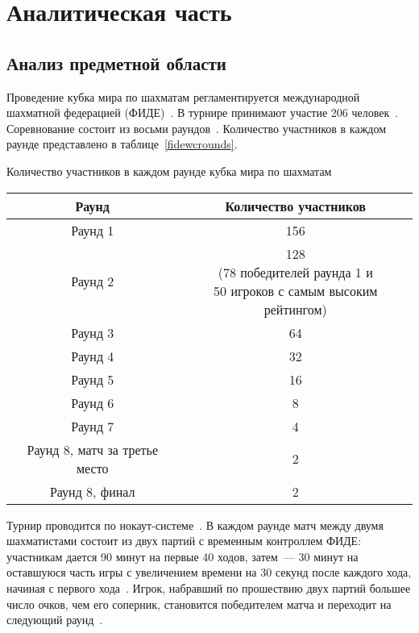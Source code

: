 \chapter{Аналитическая часть}

\section{Анализ предметной области}

Проведение кубка мира по шахматам регламентируется международной шахматной федерацией (ФИДЕ)~\cite{fidewc}.
В турнире принимают участие 206 человек~\cite{fidewc}.
Соревнование состоит из восьми раундов~\cite{fidewc}.
Количество участников в каждом раунде представлено в таблице~\ref{fidewcrounds}.
\begin{center}
	\begin{threeparttable}
		\captionsetup{justification=raggedright,singlelinecheck=off}
		\caption{\label{fidewcrounds}Количество участников в каждом раунде кубка мира по шахматам}
		\centering
		\begin{tabular}{|c|c|}
			\hline
			Раунд & Количество участников \\
			\hline
			Раунд 1 & 156 \\
			\hline
			Раунд 2 & \specialcell{128\\(78 победителей раунда 1 и\\50 игроков с самым высоким рейтингом)} \\
			\hline
			Раунд 3 & 64 \\
			\hline
			Раунд 4 & 32 \\
			\hline
			Раунд 5 & 16 \\
			\hline
			Раунд 6 & 8 \\
			\hline
			Раунд 7 & 4 \\
			\hline
			Раунд 8, матч за третье место & 2 \\
			\hline
			Раунд 8, финал & 2 \\
			\hline
		\end{tabular}
	\end{threeparttable}
\end{center}

Турнир проводится по нокаут-системе~\cite{fidewc}.
В каждом раунде матч между двумя шахматистами состоит из двух партий с временным контроллем ФИДЕ: участникам дается 90 минут на первые 40 ходов, затем~--- 30 минут на оставшуюся часть игры с увеличением времени на 30 секунд после каждого хода, начиная с первого хода~\cite{fidewc}.
Игрок, набравший по прошествию двух партий большее число очков, чем его соперник, становится победителем матча и переходит на следующий раунд~\cite{fidewc}.

